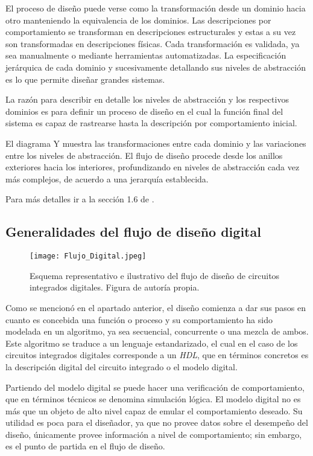 El proceso de diseño puede verse como la transformación desde un dominio hacia otro manteniendo la equivalencia de los dominios. Las descripciones por comportamiento se transforman en descripciones estructurales y estas a su vez son transformadas en descripciones físicas. Cada transformación es validada, ya sea manualmente o mediante herramientas automatizadas. La especificación jerárquica de cada dominio y sucesivamente detallando sus niveles de abstracción es lo que permite diseñar grandes sistemas. 

La razón para describir en detalle los niveles de abstracción y los respectivos dominios es para definir un proceso de diseño en el cual la función final del sistema es capaz de rastrearse hasta la descripción por comportamiento inicial.

El diagrama Y muestra las transformaciones entre cada dominio y las variaciones entre los niveles de abstracción. El flujo de diseño procede desde los anillos exteriores hacia los interiores, profundizando en niveles de abstracción cada vez más complejos, de acuerdo a una jerarquía establecida.

Para más detalles ir a la sección 1.6 de \cite{book:weste2005}.

\subsection{Generalidades del flujo de diseño digital}
\label{sec:gen_d_flow}
\begin{figure}[t]
\texttt{[image: Flujo\_Digital.jpeg]}
\centering
\caption{Esquema representativo e ilustrativo del flujo de diseño de circuitos integrados digitales. Figura de autoría propia.}
\label{Dflow1}
\end{figure}

Como se mencionó en el apartado anterior, el diseño comienza a dar sus pasos en cuanto es concebida una función o proceso y su comportamiento ha sido modelada en un algoritmo, ya sea secuencial, concurrente o una mezcla de ambos. Este algoritmo se traduce a un lenguaje estandarizado, el cual en el caso de los circuitos integrados digitales corresponde a un \textit{HDL}, que en términos concretos es la descripción digital del circuito integrado o el modelo digital.

Partiendo del modelo digital se puede hacer una verificación de comportamiento, que en términos técnicos se denomina simulación lógica. El modelo digital no es más que un objeto de alto nivel capaz de emular el comportamiento deseado. Su utilidad es poca para el diseñador, ya que no provee datos sobre el desempeño del diseño, únicamente provee 
información a nivel de comportamiento; sin embargo, es el punto de partida en el flujo de diseño.

